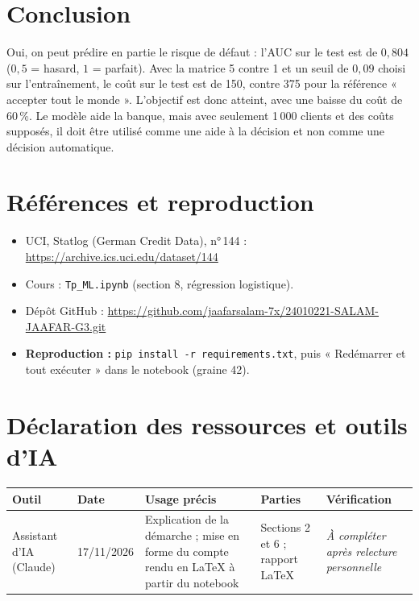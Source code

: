 \documentclass[11pt,a4paper]{article}
\begin{document}
\section{Conclusion}
Oui, on peut prédire en partie le risque de défaut : l'AUC sur le test est de $0{,}804$ ($0{,}5$ = hasard, $1$ = parfait). Avec la matrice 5 contre 1 et un seuil de $0{,}09$ choisi sur l'entraînement, le coût sur le test est de 150, contre 375 pour la référence « accepter tout le monde ». L'objectif est donc atteint, avec une baisse du coût de 60\,\%. Le modèle aide la banque, mais avec seulement 1\,000 clients et des coûts supposés, il doit être utilisé comme une aide à la décision et non comme une décision automatique.

\section{Références et reproduction}
\begin{itemize}[nosep]
  \item UCI, Statlog (German Credit Data), n°\,144 : \url{https://archive.ics.uci.edu/dataset/144}
  \item Cours : \texttt{Tp\_ML.ipynb} (section 8, régression logistique).
  \item Dépôt GitHub : \url{https://github.com/jaafarsalam-7x/24010221-SALAM-JAAFAR-G3.git}
  \item \textbf{Reproduction :} \texttt{pip install -r requirements.txt}, puis « Redémarrer et tout exécuter » dans le notebook (graine 42).
\end{itemize}

\section*{Déclaration des ressources et outils d'IA}
\begin{table}[H]
\centering\small
\begin{tabularx}{\linewidth}{@{}l l X l X@{}}
\toprule
\textbf{Outil} & \textbf{Date} & \textbf{Usage précis} & \textbf{Parties} & \textbf{Vérification} \\
\midrule
Assistant d'IA (Claude) & 17/11/2026 & Explication de la démarche ; mise en forme du compte rendu en LaTeX à partir du notebook & Sections 2 et 6 ; rapport LaTeX & \textit{À compléter après relecture personnelle} \\
\bottomrule
\end{tabularx}
\end{table}
\end{document}
